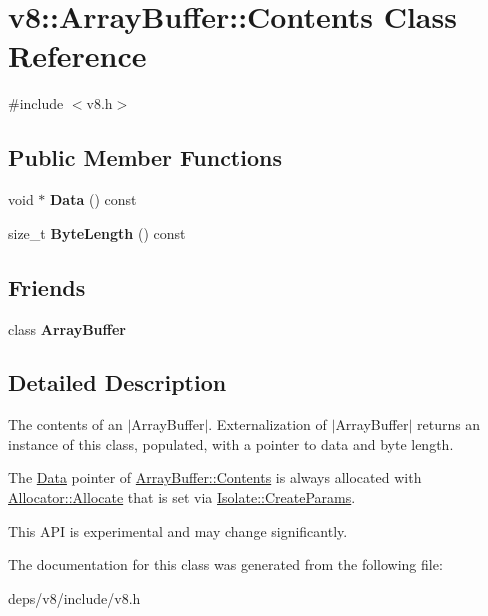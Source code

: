 \hypertarget{classv8_1_1_array_buffer_1_1_contents}{}\section{v8\+:\+:Array\+Buffer\+:\+:Contents Class Reference}
\label{classv8_1_1_array_buffer_1_1_contents}


{\ttfamily \#include $<$v8.\+h$>$}

\subsection*{Public Member Functions}
\begin{DoxyCompactItemize}
\item 
\hypertarget{classv8_1_1_array_buffer_1_1_contents_a9ed7556bfaca7a0b24deb05538a76dcd}{}void $\ast$ {\bfseries Data} () const \label{classv8_1_1_array_buffer_1_1_contents_a9ed7556bfaca7a0b24deb05538a76dcd}

\item 
\hypertarget{classv8_1_1_array_buffer_1_1_contents_a1b6a3eecb4fe05f4d33c83b6bc1fa737}{}size\+\_\+t {\bfseries Byte\+Length} () const \label{classv8_1_1_array_buffer_1_1_contents_a1b6a3eecb4fe05f4d33c83b6bc1fa737}

\end{DoxyCompactItemize}
\subsection*{Friends}
\begin{DoxyCompactItemize}
\item 
\hypertarget{classv8_1_1_array_buffer_1_1_contents_acbcb25033a90500a51aa19c811b2a1d3}{}class {\bfseries Array\+Buffer}\label{classv8_1_1_array_buffer_1_1_contents_acbcb25033a90500a51aa19c811b2a1d3}

\end{DoxyCompactItemize}


\subsection{Detailed Description}
The contents of an $\vert$\+Array\+Buffer$\vert$. Externalization of $\vert$\+Array\+Buffer$\vert$ returns an instance of this class, populated, with a pointer to data and byte length.

The \hyperlink{classv8_1_1_data}{Data} pointer of \hyperlink{classv8_1_1_array_buffer_1_1_contents}{Array\+Buffer\+::\+Contents} is always allocated with \hyperlink{classv8_1_1_array_buffer_1_1_allocator_a106b0d80120ed04fe9b9675e96f0340b}{Allocator\+::\+Allocate} that is set via \hyperlink{structv8_1_1_isolate_1_1_create_params}{Isolate\+::\+Create\+Params}.

This A\+P\+I is experimental and may change significantly. 

The documentation for this class was generated from the following file\+:\begin{DoxyCompactItemize}
\item 
deps/v8/include/v8.\+h\end{DoxyCompactItemize}
